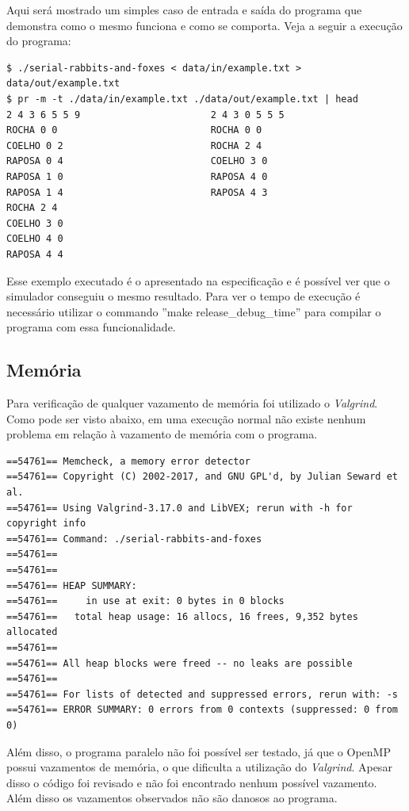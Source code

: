 \documentclass{article}
\begin{document}
Aqui será mostrado um simples caso de entrada e saída do programa que demonstra como o mesmo funciona e como se comporta. Veja a seguir a execução do programa:

\begin{verbatim}
$ ./serial-rabbits-and-foxes < data/in/example.txt > data/out/example.txt 
$ pr -m -t ./data/in/example.txt ./data/out/example.txt | head            
2 4 3 6 5 5 9                       2 4 3 0 5 5 5
ROCHA 0 0                           ROCHA 0 0
COELHO 0 2                          ROCHA 2 4
RAPOSA 0 4                          COELHO 3 0
RAPOSA 1 0                          RAPOSA 4 0
RAPOSA 1 4                          RAPOSA 4 3
ROCHA 2 4                           
COELHO 3 0                          
COELHO 4 0                          
RAPOSA 4 4                      
\end{verbatim}


Esse exemplo executado é o apresentado na especificação e é possível ver que o simulador conseguiu o mesmo resultado. Para ver o tempo de execução é necessário utilizar o commando ''make release\_debug\_time'' para compilar o programa com essa funcionalidade.

\subsection{Memória}

Para verificação de qualquer vazamento de memória foi utilizado o \textit{Valgrind}. Como pode ser visto abaixo, em uma execução normal não existe nenhum problema em relação à vazamento de memória com o programa.

	{
		\scriptsize
		\begin{verbatim}
==54761== Memcheck, a memory error detector
==54761== Copyright (C) 2002-2017, and GNU GPL'd, by Julian Seward et al.
==54761== Using Valgrind-3.17.0 and LibVEX; rerun with -h for copyright info
==54761== Command: ./serial-rabbits-and-foxes
==54761== 
==54761== 
==54761== HEAP SUMMARY:
==54761==     in use at exit: 0 bytes in 0 blocks
==54761==   total heap usage: 16 allocs, 16 frees, 9,352 bytes allocated
==54761== 
==54761== All heap blocks were freed -- no leaks are possible
==54761== 
==54761== For lists of detected and suppressed errors, rerun with: -s
==54761== ERROR SUMMARY: 0 errors from 0 contexts (suppressed: 0 from 0)
\end{verbatim}
	}

Além disso, o programa paralelo não foi possível ser testado, já que o OpenMP possui vazamentos de memória, o que dificulta a utilização do \textit{Valgrind}. Apesar disso o código foi revisado e não foi encontrado nenhum possível vazamento. Além disso os vazamentos observados não são danosos ao programa.
\end{document}
